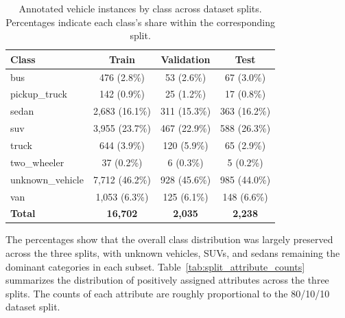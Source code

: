 \begin{table}[!htbp]
    \centering
    \caption{Annotated vehicle instances by class across dataset splits. Percentages indicate each class's share within the corresponding split.}
    \label{tab:split-class-counts}
    \begin{tabular}{lccc}
        \toprule
        \textbf{Class} & \textbf{Train} & \textbf{Validation} & \textbf{Test} \\
        \midrule
        bus              & 476 (2.8\%)    & 53 (2.6\%)   & 67 (3.0\%)   \\
        pickup\_truck    & 142 (0.9\%)    & 25 (1.2\%)   & 17 (0.8\%)   \\
        sedan            & 2,683 (16.1\%) & 311 (15.3\%) & 363 (16.2\%) \\
        suv              & 3,955 (23.7\%) & 467 (22.9\%) & 588 (26.3\%) \\
        truck            & 644 (3.9\%)    & 120 (5.9\%)  & 65 (2.9\%)   \\
        two\_wheeler     & 37 (0.2\%)     & 6 (0.3\%)    & 5 (0.2\%)    \\
        unknown\_vehicle & 7,712 (46.2\%) & 928 (45.6\%) & 985 (44.0\%) \\
        van              & 1,053 (6.3\%)  & 125 (6.1\%)  & 148 (6.6\%)  \\
        \midrule
        \textbf{Total}   & \textbf{16,702} & \textbf{2,035} & \textbf{2,238} \\
        \bottomrule
    \end{tabular}
\end{table}

\FloatBarrier
The percentages show that the overall class distribution was largely preserved 
across the three splits, with unknown vehicles, SUVs, and sedans remaining the 
dominant categories in each subset.
Table~\ref{tab:split_attribute_counts} summarizes the distribution of positively
assigned attributes across the three splits. The counts of each attribute are 
roughly proportional to the 80/10/10 dataset split. 

